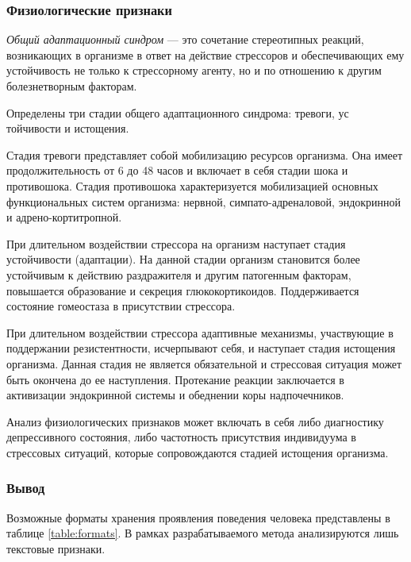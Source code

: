 \subsubsection{Физиологические признаки}

\textit{Общий адаптационный синдром} --- это сочетание стереотипных реакций, возникающих в организме в ответ на действие стрессоров и обеспечивающих ему устойчивость не только к стрессорному агенту, но и по отношению к другим болезнетворным факторам. \cite{stressAndPatology}

Определены три стадии общего адаптационного синдрома: тревоги, ус\- тойчивости и истощения.

Стадия тревоги представляет собой мобилизацию ресурсов организма. Она имеет продолжительность от 6 до 48 часов и включает в себя стадии шока и противошока. Стадия противошока характеризуется мобилизацией основных функциональных систем организма: нервной, симпато-адреналовой, эндокринной и адрено-кортитропной. \cite{stressAndPatology}

При длительном воздействии стрессора на организм наступает стадия ус\-тойчивости (адаптации). На данной стадии организм становится более устойчивым к действию раздражителя и другим патогенным факторам, повышается образование и секреция глюкокортикоидов. Поддерживается состояние гомеостаза в присутствии стрессора. \cite{stressAndPatology}

При длительном воздействии стрессора адаптивные механизмы, участвующие в поддержании резистентности, исчерпывают себя, и наступает стадия истощения организма. Данная стадия не является обязательной и стрессовая ситуация может быть окончена до ее наступления. Протекание реакции заключается в активизации эндокринной системы и обеднении коры надпочечников. \cite{stressAndPatology}

Анализ физиологических признаков может включать в себя либо диагностику депрессивного состояния, либо частотность присутствия индивидуума в стрессовых ситуаций, которые сопровождаются стадией истощения организма.

\subsubsection*{Вывод}

Возможные форматы хранения проявления поведения человека представлены в таблице \ref{table:formats}. В рамках разрабатываемого метода анализируются лишь текстовые признаки.

